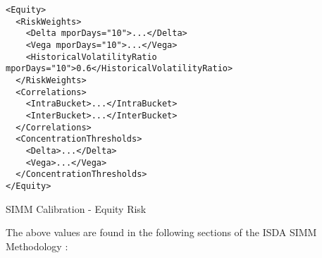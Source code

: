 \begin{listing}[H]
\begin{verbatim}
<Equity>
  <RiskWeights>
    <Delta mporDays="10">...</Delta>
    <Vega mporDays="10">...</Vega>
    <HistoricalVolatilityRatio mporDays="10">0.6</HistoricalVolatilityRatio>
  </RiskWeights>
  <Correlations>
    <IntraBucket>...</IntraBucket>
    <InterBucket>...</InterBucket>
  </Correlations>
  <ConcentrationThresholds>
    <Delta>...</Delta>
    <Vega>...</Vega>
  </ConcentrationThresholds>
</Equity>
\end{verbatim}
\caption{SIMM Calibration - Equity Risk}
\label{lst:simmcalibration_equity}
\end{listing}

The above values are found in the following sections of the ISDA SIMM Methodology \cite{SIMM2.6}:
